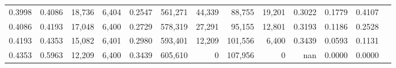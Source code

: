 \begin{tabular}{rrrrrrrrrrrrr}
0.3998 & 0.4086 & 18,736 & 6,404 &                                     0.2547 & 561,271 &  44,339 &  88,755 &  19,201 & 0.3022 & 0.1779 & 0.4107 \\
0.4086 & 0.4193 & 17,048 & 6,400 &                                     0.2729 & 578,319 &  27,291 &  95,155 &  12,801 & 0.3193 & 0.1186 & 0.2528 \\
0.4193 & 0.4353 & 15,082 & 6,401 &                                     0.2980 & 593,401 &  12,209 & 101,556 &   6,400 & 0.3439 & 0.0593 & 0.1131 \\
0.4353 & 0.5963 & 12,209 & 6,400 &                                     0.3439 & 605,610 &       0 & 107,956 &       0 &    nan & 0.0000 & 0.0000 \\
\bottomrule
\end{tabular}
